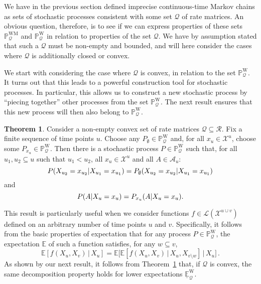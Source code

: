 \documentclass[10pt,a4paper]{paper}
\theoremstyle{definition}
\newtheorem{theorem}{Theorem}
\newcommand{\states}{\mathcal{X}}
\newcommand{\processes}{\mathbb{P}}
\newcommand{\wprocesses}{\processes^{\mathrm{W}}}
\newcommand{\wmprocesses}{\processes^{\mathrm{WM}}}
\newcommand{\gambles}{\mathcal{L}}
\newcommand{\rateset}{\mathcal{Q}}
\begin{document}
We have in the previous section defined imprecise continuous-time Markov chains as sets of stochastic processes consistent with some set $\rateset$ of rate matrices. An obvious question, therefore, is to see if we can express properties of these sets $\wmprocesses_\rateset$ and $\wprocesses_\rateset$ in relation to properties of the set $\rateset$. We have by assumption stated that such a $\rateset$ must be non-empty and bounded, and will here consider the cases where $\rateset$ is additionally closed or convex.

We start with considering the case where $\rateset$ is convex, in relation to the set $\wprocesses_\rateset$. It turns out that this leads to a powerful construction tool for stochastic processes. In particular, this allows us to construct a new stochastic process by ``piecing together'' other processes from the set $\wprocesses_\rateset$. The next result ensures that this new process will then also belong to $\wprocesses_\rateset$.
\begin{theorem}\label{theo:aanelkaarplakken}
Consider a non-empty convex set of rate matrices $\rateset\subseteq\mathcal{R}$.
Fix a finite sequence of time points $u$. Choose any $P_\emptyset\in\wprocesses_\rateset$ and, for all $x_u\in\states^u$, choose some $P_{x_u}\in\wprocesses_\rateset$. Then there is a stochastic process $P\in\wprocesses_\rateset$ such that, for all $u_1,u_2\subseteq u$ such that $u_1<u_2$, all $x_u\in\states^u$ and all $A\in\mathcal{A}_u$:
\begin{equation}\label{eq:theo:aanelkaarplakken:equalsfirst}
P(X_{u_2}=x_{u_2}\vert X_{u_1}=x_{u_1})=P_{\emptyset}(X_{u_2}=x_{u_2}\vert X_{u_1}=x_{u_1})
\vspace{-7pt}
\end{equation}
and
\begin{equation}\label{eq:theo:aanelkaarplakken:equalssecond}
P(A\vert X_u=x_u)=P_{x_u}(A\vert X_u=x_u).
\vspace{7pt}
\end{equation}
\end{theorem}
This result is particularly useful when we consider functions $f\in\gambles(\states^{u\cup v})$ defined on an arbitrary number of time points $u$ and $v$. Specifically, it follows from the basic properties of expectation that for any process $P\in\wprocesses_\rateset$, the expectation $\mathbb{E}$ of such a function satisfies, for any $w\subseteq v$,
\begin{equation*}
\mathbb{E}[f(X_u,X_v)\,\vert\,X_u] = \mathbb{E}\bigl[\mathbb{E}[f(X_u,X_v)\,\vert\,X_u,X_{v\setminus w}]\,\big\vert\,X_u\bigr]\,.
\end{equation*}
As shown by our next result, it follows from Theorem~\ref{theo:aanelkaarplakken} that, if $\rateset$ is convex, the same decomposition property holds for lower expectations $\underline{\mathbb{E}}^{\mathrm{W}}_\rateset$.
\end{document}
